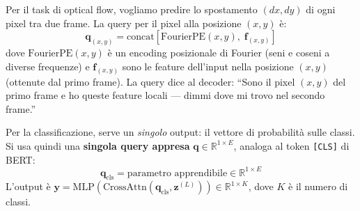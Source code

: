 \documentclass[12pt,a4paper]{article}
\begin{document}
\begin{center}
\end{center}

\begin{examplebox}
Per il task di optical flow, vogliamo predire lo spostamento $(dx, dy)$ di ogni pixel tra due frame. La query per il pixel alla posizione $(x, y)$ \`e:
\[
\mathbf{q}_{(x,y)} = \text{concat}\!\left[\text{FourierPE}(x, y), \; \mathbf{f}_{(x,y)}\right]
\]
dove $\text{FourierPE}(x, y)$ \`e un encoding posizionale di Fourier (seni e coseni a diverse frequenze) e $\mathbf{f}_{(x,y)}$ sono le feature dell'input nella posizione $(x, y)$ (ottenute dal primo frame). La query dice al decoder: ``Sono il pixel $(x,y)$ del primo frame e ho queste feature locali --- dimmi dove mi trovo nel secondo frame.''
\end{examplebox}

\begin{examplebox}
Per la classificazione, serve un \emph{singolo} output: il vettore di probabilit\`a sulle classi. Si usa quindi una \textbf{singola query appresa} $\mathbf{q} \in \mathbb{R}^{1 \times E}$, analoga al token \texttt{[CLS]} di BERT:
\[
\mathbf{q}_{\text{cls}} = \text{parametro apprendibile} \in \mathbb{R}^{1 \times E}
\]
L'output \`e $\mathbf{y} = \text{MLP}(\text{CrossAttn}(\mathbf{q}_{\text{cls}}, \mathbf{z}^{(L)})) \in \mathbb{R}^{1 \times K}$, dove $K$ \`e il numero di classi.
\end{examplebox}
\end{document}
